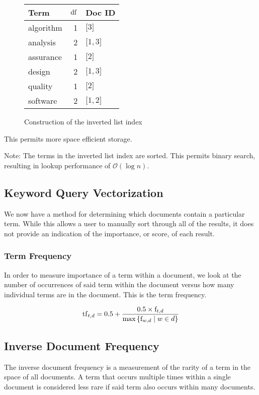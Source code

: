 \begin{ex}
\begin{figure}[!ht]
{				\centering
				\begin{tabular}{lrl}
					\toprule
					Term & $\operatorname{df}$ & Doc ID \\
					\midrule
					algorithm & 1 & $\lbrack 3\rbrack$ \\
					analysis & 2 & $\lbrack 1, 3\rbrack$ \\
					assurance & 1 & $\lbrack 2\rbrack$ \\
					design & 2 & $\lbrack 1, 3\rbrack$ \\
					quality & 1 & $\lbrack 2\rbrack$ \\
					software & 2 & $\lbrack 1, 2\rbrack$ \\
					\bottomrule
				\end{tabular}
			}
			
			\caption{Construction of the inverted list index}
		\end{figure}
		
		This permits more space efficient storage.
		
		Note:  The terms in the inverted list index are sorted.  This permits binary search, resulting in lookup performance of $\mathcal{O}\left(\log{n}\right)$.
	\end{ex}
	
	\subsection{Keyword Query Vectorization}
		We now have a method for determining which documents contain a particular term.  While this allows a user to manually sort through all of the results, it does not provide an indication of the importance, or score, of each result.
		
		\subsubsection{Term Frequency}
			In order to measure importance of a term within a document, we look at the number of occurrences of said term within the document versus how many individual terms are in the document.  This is the term frequency.
			
			$$\operatorname{tf}_{t, d} = 0.5 + \frac{0.5 \times \mathrm{f}_{t, d}}{\max{\{\mathrm{f}_{w, d} \mid w \in d}\}}$$
			
		\subsection{Inverse Document Frequency}
			The inverse document frequency is a measurement of the rarity of a term in the space of all documents.  A term that occurs multiple times within a single document is considered less rare if said term also occurs within many documents.
			
